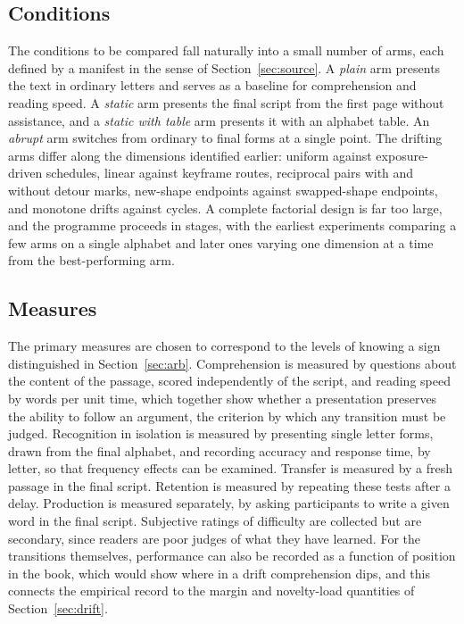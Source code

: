 \subsection{Conditions}

The conditions to be compared fall naturally into a small number of arms, each defined by a manifest in the sense of Section~\ref{sec:source}. A \emph{plain} arm presents the text in ordinary letters and serves as a baseline for comprehension and reading speed. A \emph{static} arm presents the final script from the first page without assistance, and a \emph{static with table} arm presents it with an alphabet table. An \emph{abrupt} arm switches from ordinary to final forms at a single point. The drifting arms differ along the dimensions identified earlier: uniform against exposure-driven schedules, linear against keyframe routes, reciprocal pairs with and without detour marks, new-shape endpoints against swapped-shape endpoints, and monotone drifts against cycles. A complete factorial design is far too large, and the programme proceeds in stages, with the earliest experiments comparing a few arms on a single alphabet and later ones varying one dimension at a time from the best-performing arm.

\subsection{Measures}

The primary measures are chosen to correspond to the levels of knowing a sign distinguished in Section~\ref{sec:arb}. Comprehension is measured by questions about the content of the passage, scored independently of the script, and reading speed by words per unit time, which together show whether a presentation preserves the ability to follow an argument, the criterion by which any transition must be judged. Recognition in isolation is measured by presenting single letter forms, drawn from the final alphabet, and recording accuracy and response time, by letter, so that frequency effects can be examined. Transfer is measured by a fresh passage in the final script. Retention is measured by repeating these tests after a delay. Production is measured separately, by asking participants to write a given word in the final script. Subjective ratings of difficulty are collected but are secondary, since readers are poor judges of what they have learned. For the transitions themselves, performance can also be recorded as a function of position in the book, which would show where in a drift comprehension dips, and this connects the empirical record to the margin and novelty-load quantities of Section~\ref{sec:drift}.

